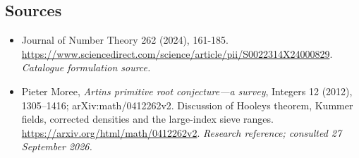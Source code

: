\documentclass[11pt,a4paper]{article}
\numberwithin{equation}{section}
\begin{document}
\subsection{Sources}
\begin{itemize}\raggedright
\item[\textnormal{[S1]}]\hypertarget{source:197:1}{} Journal of Number Theory 262 (2024), 161-185.
\url{https://www.sciencedirect.com/science/article/pii/S0022314X24000829}.
{\small\textit{Catalogue formulation source.}}
\item[\textnormal{[E1]}]\hypertarget{extra:197:1}{} Pieter Moree, \emph{Artin\textquotesingle s primitive root conjecture---a survey}, Integers 12 (2012), 1305--1416; arXiv:math/0412262v2. Discussion of Hooley\textquotesingle s theorem, Kummer fields, corrected densities and the large-index sieve ranges.
\url{https://arxiv.org/html/math/0412262v2}.
{\small\textit{Research reference; consulted 27 September 2026.}}
\end{itemize}
\end{document}
